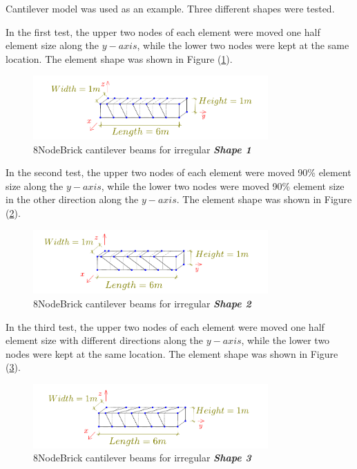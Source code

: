 \documentclass[fleqn,11pt,letter]{article}
\begin{document}
Cantilever model was used as an example. 
Three different shapes were tested. 


In the first test, the upper two nodes of each element were moved one half element size along the $y-axis$, while the lower two nodes were kept at the same location. The element shape was shown in Figure (\ref{fig irregular shape 1 8NodeBrick cantilever beams }).

\begin{figure}[H]
  \centering
  \includegraphics[width=9cm]{../Figure_files/8NodeBrick/beam_brick_shape1.pdf}
  \caption{8NodeBrick cantilever beams for irregular \textbf{\emph{Shape 1}} }
  \label{fig irregular shape 1 8NodeBrick cantilever beams }
\end{figure}


In the second test, the upper two nodes of each element were moved 90\% element size along the $y-axis$, while the lower two nodes were moved 90\% element size in the other direction along the $y-axis$. The element shape was shown in Figure (\ref{fig irregular shape 2 8NodeBrick cantilever beams }).

\begin{figure}[H]
  \centering
  \includegraphics[width=9cm]{../Figure_files/8NodeBrick/beam_brick_shape2.pdf}
  \caption{8NodeBrick cantilever beams for irregular \textbf{\emph{Shape 2}} }
  \label{fig irregular shape 2 8NodeBrick cantilever beams }
\end{figure}



In the third test, the upper two nodes of each element were moved one half element size with different directions along the $y-axis$, while the lower two nodes were kept at the same location. The element shape was shown in Figure (\ref{fig irregular shape 3 8NodeBrick cantilever beams }).

\begin{figure}[H]
  \centering
  \includegraphics[width=9cm]{../Figure_files/8NodeBrick/beam_brick_shape3.pdf}
  \caption{8NodeBrick cantilever beams for irregular \textbf{\emph{Shape 3}} }
  \label{fig irregular shape 3 8NodeBrick cantilever beams }
\end{figure}
\end{document}
